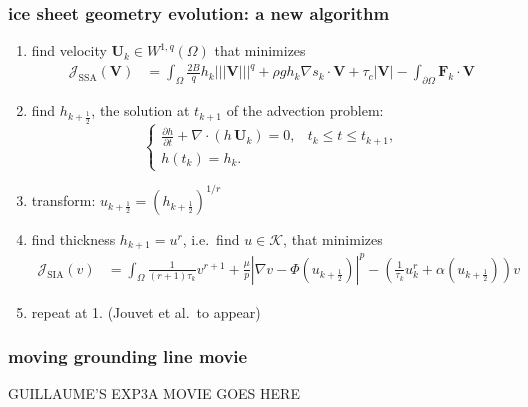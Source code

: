 \documentclass{beamer}
\newcommand{\Div}{\nabla\cdot}
\newcommand{\grad}{\nabla}
\newcommand{\Tnorm}[1]{\left|\!\left|\!\left|#1\right|\!\right|\!\right|}
\newcommand{\Wq}{W^{1,q}(\Omega)}
\begin{document}
\begin{frame}
  \frametitle{ice sheet geometry evolution: a new algorithm}

\begin{enumerate}
\small
\item find velocity $\mathbf{U}_k \in \Wq$ that minimizes
\begin{align*}
\mathcal{J}_{\text{SSA}}(\mathbf{V}) &= \int_\Omega \frac{2 B}{q} h_k \Tnorm{\mathbf{V}}^q + \rho g h_k \grad s_k \cdot \mathbf{V} + \tau_c |\mathbf{V}| - \int_{\partial\Omega} \mathbf{F}_k \cdot \mathbf{V}
\end{align*}
\item find $h_{k+\frac12}$, the solution at $t_{k+1}$ of the advection problem:
$$\begin{cases}
  \frac{\partial h}{\partial t} + \Div \left(h\, \mathbf{U}_k\right) = 0, & t_k \le t \le t_{k+1}, \\
  h(t_k) = h_k. &
\end{cases}$$
\item transform: $u_{k+\frac12} = (h_{k+\frac12})^{1/r}$
\item find thickness $h_{k+1} = u^r$, i.e.~find $u\in\mathcal{K}$, that minimizes
\begin{align*}
\mathcal{J}_{\text{SIA}}(v) &= \int_{\Omega} \frac{1}{(r+1)\tau_k} v^{r+1} + \frac{\mu}{p} |\nabla v - \Phi(u_{k+\frac12})|^p - \left(\frac{1}{\tau_k} u_k^r + \alpha(u_{k+\frac12})\right) v
\end{align*}
\item repeat at {\color{dark blue} 1.} \hfill \scriptsize (Jouvet et al.~to appear)
\end{enumerate}
\end{frame}


\begin{frame}
  \frametitle{moving grounding line movie}

\begin{center}
GUILLAUME'S EXP3A MOVIE GOES HERE
\end{center}
\end{frame}
\end{document}

